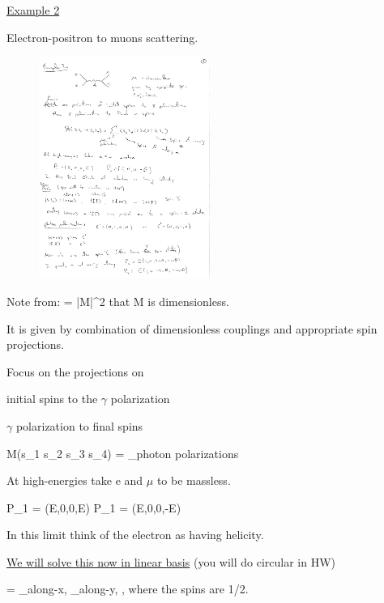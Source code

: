 {\underline{Example 2} 

Electron-positron to muons scattering.

\begin{figure}[h]
\centering
\includegraphics[width=0.5\textwidth]{./eeToMuMu.pdf}
\end{figure}

Note from:
\be
{} =    |M|^2
\ee
that M is dimensionless. 

It is given by combination of dimensionless couplings and appropriate spin projections.


Focus on the projections on
\bi
\item[-] initial spins to the $\gamma$ polarization
\item[-] $\gamma$ polarization to final spins
\ei


\be
M(s_1 s_2 \rightarrow s_3 s_4) = \underbrace{\sum_\epsilon}_{\textrm{photon polarizations}} 
\ee

At high-energies take e and $\mu$ to be massless.


\be
P_1 = (E,0,0,E) \hspace*{1in}  P_1 = (E,0,0,-E)
\ee

In this limit think of the electron as having helicity. 


\underline{We will solve this now in linear basis} (you will do circular in HW)

\be
{} = \underbrace{\ket{\leftrightarrow \leftrightarrow}}_{\textrm{along-x}}, \underbrace{\ket{\updownarrow \updownarrow}}_{\textrm{along-y}}, \ket{\leftrightarrow \updownarrow}, \ket{\updownarrow \leftrightarrow}
\ee
where the spins are 1/2. 

}
